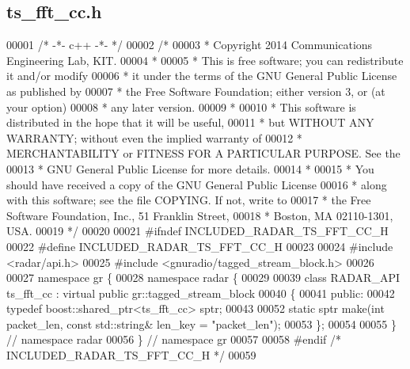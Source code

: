 \subsection{ts\+\_\+fft\+\_\+cc.\+h}
\label{ts__fft__cc_8h_source}

\begin{DoxyCode}
00001 \textcolor{comment}{/* -*- c++ -*- */}
00002 \textcolor{comment}{/* }
00003 \textcolor{comment}{ * Copyright 2014 Communications Engineering Lab, KIT.}
00004 \textcolor{comment}{ * }
00005 \textcolor{comment}{ * This is free software; you can redistribute it and/or modify}
00006 \textcolor{comment}{ * it under the terms of the GNU General Public License as published by}
00007 \textcolor{comment}{ * the Free Software Foundation; either version 3, or (at your option)}
00008 \textcolor{comment}{ * any later version.}
00009 \textcolor{comment}{ * }
00010 \textcolor{comment}{ * This software is distributed in the hope that it will be useful,}
00011 \textcolor{comment}{ * but WITHOUT ANY WARRANTY; without even the implied warranty of}
00012 \textcolor{comment}{ * MERCHANTABILITY or FITNESS FOR A PARTICULAR PURPOSE.  See the}
00013 \textcolor{comment}{ * GNU General Public License for more details.}
00014 \textcolor{comment}{ * }
00015 \textcolor{comment}{ * You should have received a copy of the GNU General Public License}
00016 \textcolor{comment}{ * along with this software; see the file COPYING.  If not, write to}
00017 \textcolor{comment}{ * the Free Software Foundation, Inc., 51 Franklin Street,}
00018 \textcolor{comment}{ * Boston, MA 02110-1301, USA.}
00019 \textcolor{comment}{ */}
00020  
00021 \textcolor{preprocessor}{#ifndef INCLUDED\_RADAR\_TS\_FFT\_CC\_H}
00022 \textcolor{preprocessor}{#define INCLUDED\_RADAR\_TS\_FFT\_CC\_H}
00023 
00024 \textcolor{preprocessor}{#include <radar/api.h>}
00025 \textcolor{preprocessor}{#include <gnuradio/tagged\_stream\_block.h>}
00026 
00027 \textcolor{keyword}{namespace }gr \{
00028   \textcolor{keyword}{namespace }radar \{
00029 
00039     \textcolor{keyword}{class }RADAR_API ts_fft_cc : \textcolor{keyword}{virtual} \textcolor{keyword}{public} gr::tagged\_stream\_block
00040     \{
00041      \textcolor{keyword}{public}:
00042       \textcolor{keyword}{typedef} boost::shared\_ptr<ts\_fft\_cc> sptr;
00043 
00052       \textcolor{keyword}{static} sptr make(\textcolor{keywordtype}{int} packet\_len, \textcolor{keyword}{const} std::string& len\_key = \textcolor{stringliteral}{"packet\_len"});
00053     \};
00054 
00055   \} \textcolor{comment}{// namespace radar}
00056 \} \textcolor{comment}{// namespace gr}
00057 
00058 \textcolor{preprocessor}{#endif }\textcolor{comment}{/* INCLUDED\_RADAR\_TS\_FFT\_CC\_H */}\textcolor{preprocessor}{}
00059 
\end{DoxyCode}
